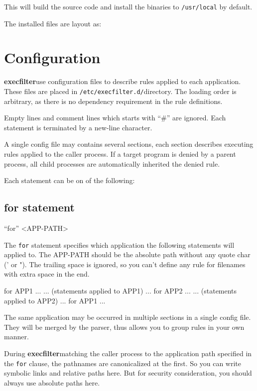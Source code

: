 \documentclass[hyperref, bookmark]{z-article}
\newcommand\code[1]{\texttt{#1}}
\newcommand\xfilt{\textbf{execfilter}}
\newcommand\configdir{\texttt{/etc/execfilter.d/}}
\begin{document}
This will build the source code and install the binaries to \code{/usr/local}
by default.

The installed files are layout as:

\def\filetreescale{0.7}


\section {Configuration}

\xfilt use configuration files to describe rules applied to each
application. These files are placed in \configdir directory. The loading order
is arbitrary, as there is no dependency requirement in the rule definitions.

Empty lines and comment lines which starts with ``\#'' are ignored.  Each statement
is terminated by a new-line character.

A single config file may contains several sections, each section describes
executing rules applied to the caller process.  If a target program is denied by
a parent process, all child processes are automatically inherited the denied
rule.

Each statement can be on of the following:

\subsection {for statement}

\begin{syntax}
  ``for'' <APP-PATH>
\end{syntax}

The \code{for} statement specifies which application the following statements
will applied to. The APP-PATH should be the absolute path without any quote char
(' or ").  The trailing space is ignored, so you can't define any rule for
filenames with extra space in the end.

\begin{codeblk}
  for APP1
  ...
  ... (statements applied to APP1)
  ...
  for APP2
  ...
  ... (statements applied to APP2)
  ...
  for APP1
  ...
\end{codeblk}

The same application may be occurred in multiple sections in a single config
file.  They will be merged by the parser, thus allows you to group rules in your
own manner.

During \xfilt matching the caller process to the application path specified in
the \code{for} clause, the pathnames are canonicalized at the first.  So you can
write symbolic links and relative paths here. But for security consideration,
you should always use absolute paths here.
\end{document}
